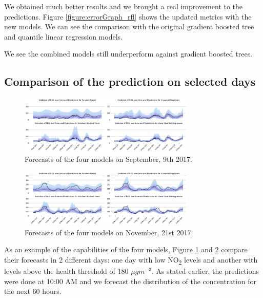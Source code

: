 \documentclass[a4paper,twocolumn,5p]{elsarticle}
\begin{document}
We obtained much better results and we brought a real improvement to
the predictions. Figure \ref{figure:errorGraph_rfl} shows the updated
metrics with the new models.  We can see the comparison with the
original gradient boosted tree and quantile linear regression models.

We see the combined models still underperform against gradient boosted
trees.



\subsection{Comparison of the prediction on selected days}

\begin{figure}
  \centering
  \includegraphics[width=0.75\textwidth]{evoday1}
  \caption{Forecasts of the four models on September, 9th
    2017. }
  \label{figure:evoday1} 
\end{figure}

\begin{figure}
  \centering
  \includegraphics[width=0.75\textwidth]{evoday2}
  \caption{Forecasts of the four models on November, 21st 2017.  }
  \label{figure:evoday2} 
\end{figure}

As an example of the capabilities of the four models, Figure
\ref{figure:evoday1} and \ref{figure:evoday2} compare their forecasts
in 2 different days: one day with low NO\textsubscript{2} levels and
another with levels above the health threshold of 180 $\mu gm^{-3}$.
As stated earlier, the predictions were done at 10:00 AM and we
forecast the distribution of the concentration for the next 60 hours.
\end{document}
